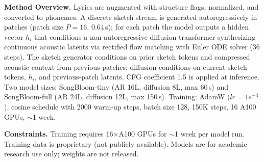 \begin{tcolorbox}
\smallskip
\textbf{Method Overview.} Lyrics are augmented with structure flags, normalized, and converted to phonemes. A discrete sketch stream is generated autoregressively in patches (patch size $P=16$, 0.64\,s); for each patch the model outputs a hidden vector $h_i$ that conditions a non-autoregressive diffusion transformer synthesizing continuous acoustic latents via rectified flow matching with Euler ODE solver (36 steps). The sketch generator conditions on prior sketch tokens and compressed acoustic context from previous patches; diffusion conditions on current sketch tokens, $h_i$, and previous-patch latents. CFG coefficient 1.5 is applied at inference. Two model sizes: SongBloom-tiny (AR 16L, diffusion 8L, max 60\,s) and SongBloom-full (AR 24L, diffusion 12L, max 150\,s). Training: AdamW ($lr=1e^{-4}$), cosine schedule with 2000 warm-up steps, batch size 128, 150K steps, 16 A100 GPUs, $\sim$1 week.

\smallskip
\textbf{Constraints.} Training requires 16$\times$A100 GPUs for $\sim$1 week per model run. Training data is proprietary (not publicly available). Models are for academic research use only; weights are not released.
\end{tcolorbox}

